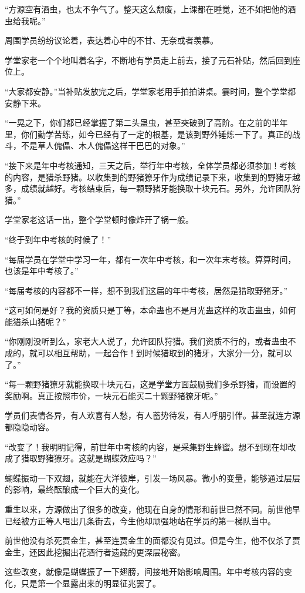 \begin{this_body}
“方源空有酒虫，也太不争气了。整天这么颓废，上课都在睡觉，还不如把他的酒虫给我呢。”

周围学员纷纷议论着，表达着心中的不甘、无奈或者羡慕。

学堂家老一个个地叫着名字，不断地有学员走上前去，接了元石补贴，然后回到座位上。

“大家都安静。”当补贴发放完之后，学堂家老用手拍拍讲桌。霎时间，整个学堂都安静下来。

“一晃之下，你们都已经掌握了第二头蛊虫，甚至突破到了高阶。在之前的半年里，你们勤学苦练，如今已经有了一定的根基，是该到野外锤炼一下了。真正的战斗，不是草人傀儡、木人傀儡这样干巴巴的对象。”

“接下来是年中考核通知，三天之后，举行年中考核，全体学员都必须参加！考核的内容，是猎杀野猪。以收集到的野猪獠牙作为成绩记录下来，收集到的野猪牙越多，成绩就越好。考核结束后，每一颗野猪牙能换取十块元石。另外，允许团队狩猎。”

学堂家老这话一出，整个学堂顿时像炸开了锅一般。

“终于到年中考核的时候了！”

“每届学员在学堂中学习一年，都有一次年中考核，和一次年末考核。算算时间，也该是年中考核了。”

“每届考核的内容都不一样，想不到我们这届的年中考核，居然是猎取野猪牙。”

“这可如何是好？我的资质只是丁等，本命蛊也不是月光蛊这样的攻击蛊虫，如何能猎杀山猪呢？”

“你刚刚没听到么，家老大人说了，允许团队狩猎。我们资质不行的，或者蛊虫不成的，就可以相互帮助，一起合作！到时候猎取到的猪牙，大家分一分，就可以了。”

“每一颗野猪獠牙就能换取十块元石，这是学堂方面鼓励我们多杀野猪，而设置的奖励啊。真正按照市价，一块元石能买二十颗野猪獠牙呢。”

学员们表情各异，有人欢喜有人愁，有人蓄势待发，有人呼朋引伴。甚至就连方源都隐隐动容。

“改变了！我明明记得，前世年中考核的内容，是采集野生蜂蜜。想不到现在却改成了猎取野猪獠牙。这就是蝴蝶效应吗？”

蝴蝶振动一下双翅，就能在大洋彼岸，引发一场风暴。微小的变量，能够通过层层的影响，最终酝酿成一个巨大的变化。

重生以来，方源做出了很多的改变，他现在自身的情形和前世已然不同。前世他早已经被方正等人甩出几条街去，今生他却顽强地站在学员的第一梯队当中。

前世他没有杀死贾金生，甚至连贾金生的面都没有见过。但是今生，他不仅杀了贾金生，还因此挖掘出花酒行者遗藏的更深层秘密。

这些改变，就像是蝴蝶振了一下翅膀，间接地开始影响周围。年中考核内容的变化，只是第一个显露出来的明显征兆罢了。


\end{this_body}
